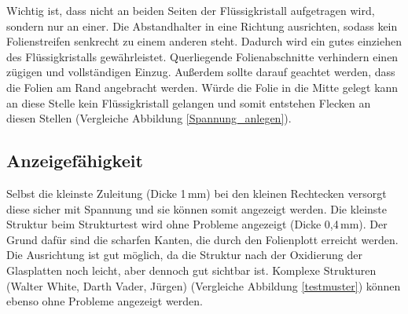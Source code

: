 Wichtig ist, dass nicht an beiden Seiten der Flüssigkristall aufgetragen wird, sondern nur an einer.
Die Abstandhalter in eine Richtung ausrichten, sodass kein Folienstreifen senkrecht zu einem anderen steht. Dadurch wird ein gutes einziehen des Flüssigkristalls gewährleistet. Querliegende Folienabschnitte verhindern einen zügigen und vollständigen Einzug.
Außerdem sollte darauf geachtet werden, dass die Folien am Rand angebracht werden. Würde die Folie in die Mitte gelegt kann an diese Stelle kein Flüssigkristall gelangen und somit entstehen Flecken an diesen Stellen (Vergleiche Abbildung \ref{Spannung_anlegen}).

\subsection{Anzeigefähigkeit}
Selbst die kleinste Zuleitung (Dicke 1\,mm) bei den kleinen Rechtecken versorgt diese sicher mit Spannung und sie können somit angezeigt werden. Die kleinste Struktur beim Strukturtest wird ohne Probleme angezeigt (Dicke 0,4\,mm). Der Grund dafür sind die scharfen Kanten, die durch den Folienplott erreicht werden. Die Ausrichtung ist gut möglich, da die Struktur nach der Oxidierung der Glasplatten noch leicht, aber dennoch gut sichtbar ist. Komplexe Strukturen (Walter White, Darth Vader, Jürgen) (Vergleiche Abbildung \ref{testmuster}) können ebenso ohne Probleme angezeigt werden.

